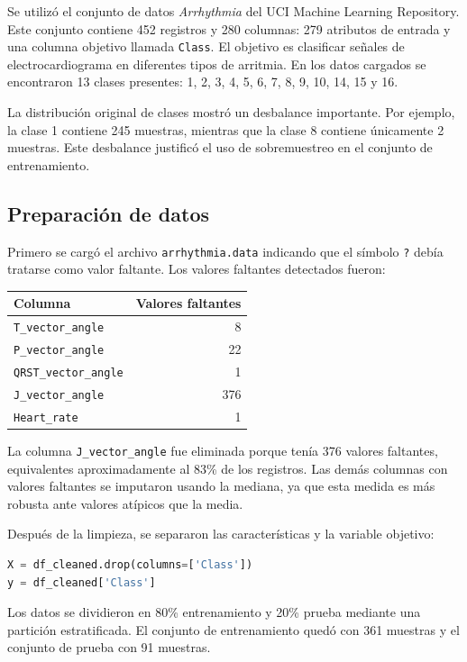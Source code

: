 \documentclass{article}
\begin{document}
Se utilizó el conjunto de datos \textit{Arrhythmia} del UCI Machine Learning Repository. Este conjunto contiene 452 registros y 280 columnas: 279 atributos de entrada y una columna objetivo llamada \texttt{Class}. El objetivo es clasificar señales de electrocardiograma en diferentes tipos de arritmia. En los datos cargados se encontraron 13 clases presentes: 1, 2, 3, 4, 5, 6, 7, 8, 9, 10, 14, 15 y 16.

La distribución original de clases mostró un desbalance importante. Por ejemplo, la clase 1 contiene 245 muestras, mientras que la clase 8 contiene únicamente 2 muestras. Este desbalance justificó el uso de sobremuestreo en el conjunto de entrenamiento.

\subsection{Preparación de datos}

Primero se cargó el archivo \texttt{arrhythmia.data} indicando que el símbolo \texttt{?} debía tratarse como valor faltante. Los valores faltantes detectados fueron:

\begin{center}
\begin{tabular}{lr}
\toprule
Columna & Valores faltantes \\
\midrule
\texttt{T\_vector\_angle} & 8 \\
\texttt{P\_vector\_angle} & 22 \\
\texttt{QRST\_vector\_angle} & 1 \\
\texttt{J\_vector\_angle} & 376 \\
\texttt{Heart\_rate} & 1 \\
\bottomrule
\end{tabular}
\end{center}

La columna \texttt{J\_vector\_angle} fue eliminada porque tenía 376 valores faltantes, equivalentes aproximadamente al 83\% de los registros. Las demás columnas con valores faltantes se imputaron usando la mediana, ya que esta medida es más robusta ante valores atípicos que la media.

Después de la limpieza, se separaron las características y la variable objetivo:

\begin{lstlisting}[language=Python]
X = df_cleaned.drop(columns=['Class'])
y = df_cleaned['Class']
\end{lstlisting}

Los datos se dividieron en 80\% entrenamiento y 20\% prueba mediante una partición estratificada. El conjunto de entrenamiento quedó con 361 muestras y el conjunto de prueba con 91 muestras.
\end{document}
